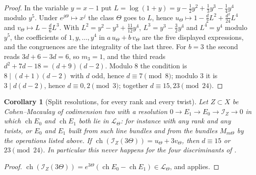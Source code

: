 \documentclass[11pt,reqno]{amsart}
\theoremstyle{plain}
\newtheorem{corollary}[theorem]{Corollary}
\theoremstyle{definition}
\theoremstyle{remark}
\newcommand{\cL}{\mathcal{L}}
\newcommand{\cI}{\mathcal{I}}
\DeclareMathOperator{\ch}{ch}
\begin{document}
\begin{proof}
In the variable $y=x-1$ put
$L=\log(1+y)=y-\tfrac12y^{2}+\tfrac13y^{3}-\tfrac14y^{4}$ modulo $y^{5}$.
Under $e^{j\Theta}\mapsto x^{j}$ the class $\Theta$ goes to $L$, hence
$u_{\Theta}\mapsto1-\tfrac d2L^{2}+\tfrac{d^{2}}{24}L^{4}$ and
$v_{\Theta}\mapsto L-\tfrac d6L^{3}$. With
$L^{2}=y^{2}-y^{3}+\tfrac{11}{12}y^{4}$, $L^{3}=y^{3}-\tfrac32y^{4}$ and
$L^{4}=y^{4}$ modulo $y^{5}$, the coefficients of $1,y,\dots,y^{4}$ in
$a\,u_{\Theta}+b\,v_{\Theta}$ are the five displayed expressions, and the
congruences are the integrality of the last three. For $b=3$ the second
reads $3d+6-3d=6$, so $m_{3}=1$, and the third reads
$d^{2}+7d-18=(d+9)(d-2)$. Modulo $8$ the condition is $8\mid(d+1)(d-2)$
with $d$ odd, hence $d\equiv7\pmod8$; modulo $3$ it is $3\mid d(d-2)$, hence
$d\equiv0,2\pmod3$; together $d\equiv15,23\pmod{24}$.
\end{proof}

\begin{corollary}[Split resolutions, for every rank and every twist]
\label{cor:latticeburch}
Let $Z\subset X$ be Cohen--Macaulay of codimension two with a resolution
$0\to E_{1}\to E_{0}\to\cI_{Z}\to0$ in which $\ch E_{0}$ and $\ch E_{1}$ both
lie in $\cL_{\Theta}$: for instance  with any rank and any
twists, or $E_{0}$ and $E_{1}$ built from such line bundles and from the
bundles $M_{m\Theta}$ by the operations listed above. If
$\ch(\cI_{Z}(3\Theta))=u_{\Theta}+3v_{\Theta}$, then $d\equiv15$ or
$23\pmod{24}$. In particular this never happens for the four discriminants
of .
\end{corollary}

\begin{proof}
$\ch(\cI_{Z}(3\Theta))=e^{3\Theta}(\ch E_{0}-\ch E_{1})\in\cL_{\Theta}$, and
 applies.
\end{proof}
\end{document}
